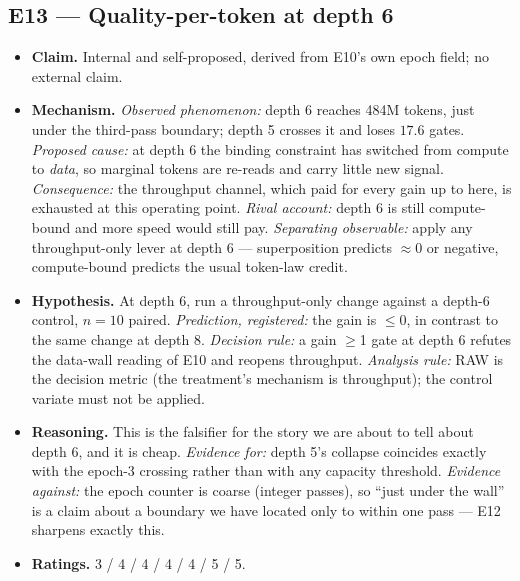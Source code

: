\documentclass{article}
\begin{document}
\subsection{E13 --- Quality-per-token at depth 6}
\begin{itemize}\itemsep2pt
\item \textbf{Claim.} Internal and self-proposed, derived from E10's own epoch field; no external claim.
\item \textbf{Mechanism.} \emph{Observed phenomenon:} depth 6 reaches 484M tokens, just under the third-pass boundary; depth 5 crosses it and loses $17.6$ gates. \emph{Proposed cause:} at depth 6 the binding constraint has switched from compute to \emph{data}, so marginal tokens are re-reads and carry little new signal. \emph{Consequence:} the throughput channel, which paid for every gain up to here, is exhausted at this operating point. \emph{Rival account:} depth 6 is still compute-bound and more speed would still pay. \emph{Separating observable:} apply any throughput-only lever at depth 6 --- superposition predicts $\approx$0 or negative, compute-bound predicts the usual token-law credit.
\item \textbf{Hypothesis.} At depth 6, run a throughput-only change against a depth-6 control, $n{=}10$ paired. \emph{Prediction, registered:} the gain is $\le$0, in contrast to the same change at depth 8. \emph{Decision rule:} a gain $\ge$1 gate at depth 6 refutes the data-wall reading of E10 and reopens throughput. \emph{Analysis rule:} RAW is the decision metric (the treatment's mechanism is throughput); the control variate must not be applied.
\item \textbf{Reasoning.} This is the falsifier for the story we are about to tell about depth 6, and it is cheap. \emph{Evidence for:} depth 5's collapse coincides exactly with the epoch-3 crossing rather than with any capacity threshold. \emph{Evidence against:} the epoch counter is coarse (integer passes), so ``just under the wall'' is a claim about a boundary we have located only to within one pass --- E12 sharpens exactly this.
\item \textbf{Ratings.} 3 / 4 / 4 / 4 / 4 / 5 / 5.
\end{itemize}
\end{document}
